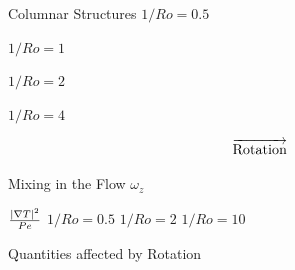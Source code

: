 \documentclass{beamer}
\begin{document}
\begin{frame}{Columnar Structures}
    \centering
        \centering
        $1/Ro = 0.5$
        \vspace{2pt}
        
    \emp
    \hspace{1pt}
        \centering
        $1/Ro = 1$
        \vspace{2pt}
 
    \emp
    \hspace{1pt}
        \centering
        $1/Ro = 2$
        \vspace{2pt}
        
    \emp
    \hspace{1pt}
        \centering
         $1/Ro = 4$
        \vspace{2pt}

    \emp
    \[\overrightarrow{\rm Rotation}\]
\end{frame}

\begin{frame}{Mixing in the Flow}
        $\omega_z$
        
        \vspace{75pt}
        
        $\frac{|\nabla T|^2}{Pe}$
    \emp
        \centering
        $1/Ro = 0.5$
    \emp
        \centering
        $1/Ro = 2$
    \emp
        \centering
        $1/Ro = 10$
    \emp
\end{frame}

\begin{frame}{Quantities affected by Rotation}
        \centering
    
    \emp
    \hspace{2pt} 
        \centering

    \emp
\end{frame}
\end{document}
